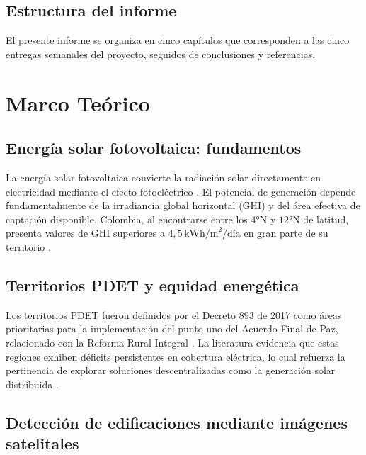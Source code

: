\documentclass[12pt, a4paper]{report}
\begin{document}
\section{Estructura del informe}

El presente informe se organiza en cinco capítulos que corresponden a las
cinco entregas semanales del proyecto, seguidos de conclusiones y referencias.

\chapter{Marco Teórico}
\label{cap:marco}

\section{Energía solar fotovoltaica: fundamentos}

La energía solar fotovoltaica convierte la radiación solar directamente en
electricidad mediante el efecto fotoeléctrico \parencite{luque2011handbook}.
El potencial de generación depende fundamentalmente de la irradiancia global
horizontal (GHI) y del área efectiva de captación disponible. Colombia, al
encontrarse entre los $4°\text{N}$ y $12°\text{N}$ de latitud, presenta
valores de GHI superiores a $4{,}5\,\text{kWh/m}^2/\text{día}$ en gran parte
de su territorio \parencite{atlas2020solar}.

\section{Territorios PDET y equidad energética}

Los territorios PDET fueron definidos por el Decreto 893 de 2017 como áreas
prioritarias para la implementación del punto uno del Acuerdo Final de Paz,
relacionado con la Reforma Rural Integral \parencite{decreto893_2017}.
La literatura evidencia que estas regiones exhiben déficits persistentes
en cobertura eléctrica, lo cual refuerza la pertinencia de explorar soluciones
descentralizadas como la generación solar distribuida
\parencite{rodriguez2020energia}.

\section{Detección de edificaciones mediante imágenes satelitales}
\end{document}
